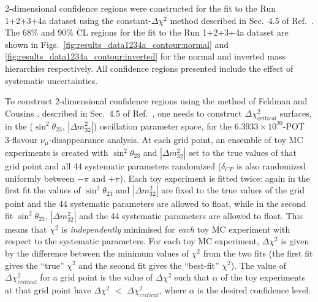 2-dimensional confidence regions were constructed
for the %
fit to the Run 1+2+3+4a dataset 
using the constant-$\Delta\chi^2$ method described in 
Sec.\ 4.5 of Ref.\ \cite{OurRun123DisappAnalysis3Flavour}.
The 68\% and 90\% CL regions for the fit to the Run 1+2+3+4a dataset are shown 
in Figs.\ \ref{fig:results_data1234a_contour:normal} and \ref{fig:results_data1234a_contour:inverted}
for the normal and inverted mass hierarchies respectively.
All confidence regions presented include the effect of systematic uncertainties.

To construct 2-dimensional confidence regions using the method of Feldman and Cousins \cite{FeldmanCousins},
described in Sec.\ 4.5 of Ref.\ \cite{OurRun123DisappAnalysis3Flavour}, 
one needs to construct $\Delta\chi^{2}_{critical}$ surfaces,
in the ($\sin^{2}\theta_{23}$, $|\Delta m^{2}_{32}|$) oscillation parameter space,
for the $6.3933 \times 10^{20}$-POT 3-flavour $\nu_{\mu}$-disappearance analysis.
At each grid point, an ensemble of toy MC experiments is created with $\sin^{2}\theta_{23}$ and $|\Delta m^{2}_{32}|$
set to the true values of that grid point and all 44 systematic parameters randomized ($\delta_{CP}$ is also randomized uniformly between $-\pi$ and $+\pi$).
Each toy experiment 
is fitted twice: again in the first fit the values of $\sin^{2}\theta_{23}$ and $|\Delta m^{2}_{32}|$ are fixed to the true
values of the grid point and the 44 systematic parameters are allowed to float, while in the 
second fit $\sin^{2}\theta_{23}$, $|\Delta m^{2}_{32}|$ and the 44 systematic parameters are allowed to 
float. This means that $\chi^{2}$ is {\em independently} minimised for {\em each} toy MC experiment with respect 
to the systematic parameters. For each toy MC experiment, $\Delta\chi^2$ is given by the difference between the 
minimum values of $\chi^{2}$ from the two fits (the first fit gives the ``true'' $\chi^{2}$ and the 
second fit gives the ``best-fit'' $\chi^{2}$). The value of $\Delta\chi^{2}_{critical}$ for a grid 
point is the value of $\Delta\chi^2$ such that $\alpha$ of the toy experiments at that grid point have 
$\Delta\chi^2$ $<$ $\Delta\chi^{2}_{critical}$, where $\alpha$ is the desired confidence level.  

